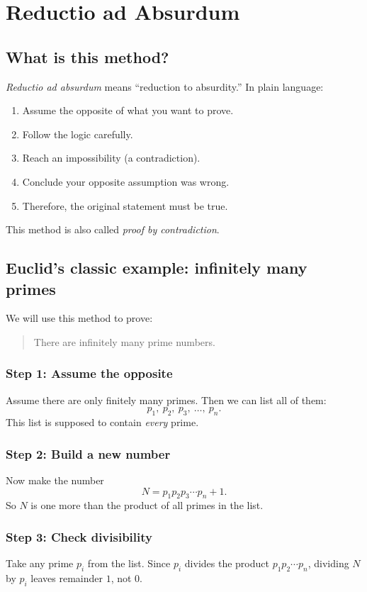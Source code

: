 \chapter{Reductio ad Absurdum}
\section{What is this method?}
\emph{Reductio ad absurdum} means ``reduction to absurdity.'' In plain language:
\begin{enumerate}
  \item Assume the opposite of what you want to prove.
  \item Follow the logic carefully.
  \item Reach an impossibility (a contradiction).
  \item Conclude your opposite assumption was wrong.
  \item Therefore, the original statement must be true.
\end{enumerate}

This method is also called \emph{proof by contradiction}.

\section{Euclid's classic example: infinitely many primes}
We will use this method to prove:
\begin{quote}
There are infinitely many prime numbers.
\end{quote}

\subsection*{Step 1: Assume the opposite}
Assume there are only finitely many primes. Then we can list all of them:
\[
p_1,\ p_2,\ p_3,\ \ldots,\ p_n.
\]
This list is supposed to contain \emph{every} prime.

\subsection*{Step 2: Build a new number}
Now make the number
\[
N=p_1p_2p_3\cdots p_n+1.
\]
So \(N\) is one more than the product of all primes in the list.

\subsection*{Step 3: Check divisibility}
Take any prime \(p_i\) from the list. Since \(p_i\) divides the product
\(p_1p_2\cdots p_n\), dividing \(N\) by \(p_i\) leaves remainder \(1\), not \(0\).

